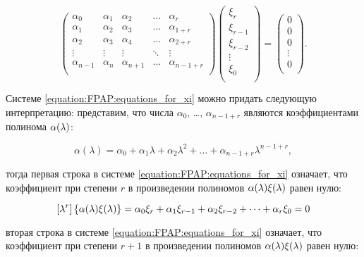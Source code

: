 	\begin{equation} \label{equation:FPAP:equations_for_xi}
		\begin{pmatrix}
			\alpha_0     & \alpha_1 & \alpha_2     & \ldots & \alpha_r \\
			\alpha_1     & \alpha_2 & \alpha_3     & \ldots & \alpha_{1+r} \\
			\alpha_2     & \alpha_3 & \alpha_4     & \ldots & \alpha_{2+r} \\
			\vdots       & \vdots   & \vdots       & \ddots & \vdots \\
			\alpha_{n-1} & \alpha_n & \alpha_{n+1} & \ldots & \alpha_{n-1+r} \\
		\end{pmatrix}
		\begin{pmatrix}
			\xi_r \\
			\xi_{r-1} \\
			\xi_{r-2} \\
			\vdots \\
			\xi_0 \\
		\end{pmatrix}
		=
		\begin{pmatrix}
			0 \\
			0 \\
			0 \\
			\vdots \\
			0 \\
		\end{pmatrix}
		.
	\end{equation}

Системе \eqref{equation:FPAP:equations_for_xi} можно придать следующую интерпретацию: представим, что числа $\alpha_0$, \dots, $\alpha_{n-1+r}$
являются коэффициентами полинома $\alpha (\lambda)$:

	$$ \alpha(\lambda) = \alpha_0 + \alpha_1 \lambda + \alpha_2 \lambda^2 + \dots + \alpha_{n-1+r} \lambda^{n-1+r}, $$

тогда первая строка в системе \eqref{equation:FPAP:equations_for_xi} означает, что коэффициент при степени $r$ в произведении полиномов
$\alpha (\lambda) \xi (\lambda)$ равен нулю:

	$$ \left [ \lambda^{r} \right ] \left \{ \alpha (\lambda) \xi (\lambda) \right \}
		= \alpha_0 \xi_r + \alpha_1 \xi_{r-1} + \alpha_2 \xi_{r-2} + \dots + \alpha_r \xi_0 = 0 $$

вторая строка в системе \eqref{equation:FPAP:equations_for_xi} означает, что коэффициент при степени $r+1$ в произведении полиномов
$\alpha (\lambda) \xi (\lambda)$ равен нулю:

